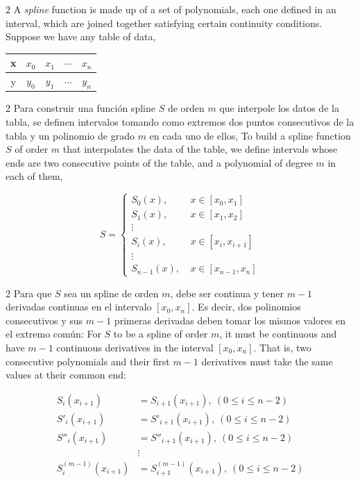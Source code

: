 \begin{paracol}{2}
A \emph{spline} function is made up of a set of polynomials, each one defined in an interval, which are joined together satisfying certain continuity conditions. Suppose we have any table of data,
\end{paracol}
\begin{table}[h]
\centering
\begin{tabular}{c|cccc}
x&$x_0$&$x_1$&$\cdots$&$x_n$\\
\hline
y&$y_0$&$y_1$&$\cdots$&$y_n$
\end{tabular}
\end{table}
\begin{paracol}{2}
Para construir una función spline $S$ de orden $m$ que interpole los datos de la tabla, se definen intervalos tomando como extremos dos puntos consecutivos de la tabla y un polinomio de grado $m$ en cada uno de ellos,
\switchcolumn
To build a spline function $S$ of order $m$ that interpolates the data of the table, we define intervals whose ends are two consecutive points of the table, and a polynomial of degree $m$ in each of them,
\end{paracol}
\begin{equation*}
S= \left\{
\begin{aligned}
S_0(x),& \ x\in [x_0,x_1]\\
S_1(x),& \ x\in [x_1,x_2]\\
\vdots \\
S_i(x),& \ x\in [x_i,x_{i+1}]\\
\vdots \\
S_{n-1}(x),& \ x\in [x_{n-1},x_n]
\end{aligned}
\right.
\end{equation*}
\begin{paracol}{2}
Para que $S$ sea un spline de orden $m$, debe ser continua y tener $m-1$ derivadas continuas en el intervalo $[x_0,x_n]$. Es decir, dos polinomios consecutivos y sus $m-1$ primeras derivadas deben tomar los mismos valores en el extremo común:
\switchcolumn
For $S$ to be a spline of order $m$, it must be continuous and have $m-1$ continuous derivatives in the interval $[x_0,x_n]$. That is, two consecutive polynomials and their first $m-1$ derivatives must take the same values at their common end:
\end{paracol}
\begin{align*}
S_i(x_{i+1})&=S_{i+1}(x_{i+1}),\ (0\leq i \leq n-2)\\
S'_i(x_{i+1})&=S'_{i+1}(x_{i+1}),\ (0\leq i \leq n-2)\\
S''_i(x_{i+1})&=S''_{i+1}(x_{i+1}),\ (0\leq i \leq n-2)\\
&\vdots \\
S^{(m-1)}_i(x_{i+1})&=S^{(m-1)}_{i+1}(x_{i+1}),\ (0\leq i \leq n-2)
\end{align*}
